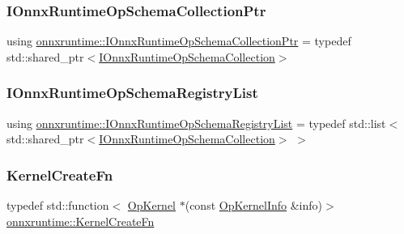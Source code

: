 \subsubsection{\texorpdfstring{I\+Onnx\+Runtime\+Op\+Schema\+Collection\+Ptr}{IOnnxRuntimeOpSchemaCollectionPtr}}
{\footnotesize\ttfamily using \mbox{\hyperlink{namespaceonnxruntime_af9a8d0a11a8e0ccd714c7ddc2fabe41d}{onnxruntime\+::\+I\+Onnx\+Runtime\+Op\+Schema\+Collection\+Ptr}} = typedef std\+::shared\+\_\+ptr$<$\mbox{\hyperlink{classonnxruntime_1_1IOnnxRuntimeOpSchemaCollection}{I\+Onnx\+Runtime\+Op\+Schema\+Collection}}$>$}

\mbox{\label{namespaceonnxruntime_a37a91305e7190e83fa9c66117a6a4746}} 
\subsubsection{\texorpdfstring{I\+Onnx\+Runtime\+Op\+Schema\+Registry\+List}{IOnnxRuntimeOpSchemaRegistryList}}
{\footnotesize\ttfamily using \mbox{\hyperlink{namespaceonnxruntime_a37a91305e7190e83fa9c66117a6a4746}{onnxruntime\+::\+I\+Onnx\+Runtime\+Op\+Schema\+Registry\+List}} = typedef std\+::list$<$std\+::shared\+\_\+ptr$<$\mbox{\hyperlink{classonnxruntime_1_1IOnnxRuntimeOpSchemaCollection}{I\+Onnx\+Runtime\+Op\+Schema\+Collection}}$>$ $>$}

\mbox{\label{namespaceonnxruntime_a2e23731e78afbe4e5e15a18493162335}} 
\subsubsection{\texorpdfstring{Kernel\+Create\+Fn}{KernelCreateFn}}
{\footnotesize\ttfamily typedef std\+::function$<$ \mbox{\hyperlink{classonnxruntime_1_1OpKernel}{Op\+Kernel}} $\ast$(const \mbox{\hyperlink{classonnxruntime_1_1OpKernelInfo}{Op\+Kernel\+Info}} \&info)$>$ \mbox{\hyperlink{namespaceonnxruntime_a2e23731e78afbe4e5e15a18493162335}{onnxruntime\+::\+Kernel\+Create\+Fn}}}

\mbox{\label{namespaceonnxruntime_a7f8ff42cd4a103e3be4c6f4227448d28}} 
